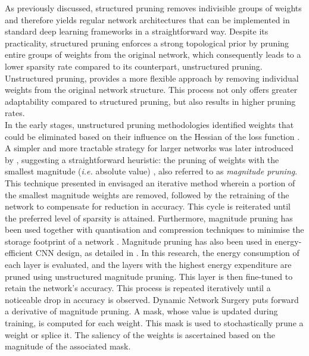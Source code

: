 As previously discussed, structured pruning removes indivisible groups of
weights and therefore yields regular network architectures that can be
implemented in standard deep learning frameworks in a straightforward way.
Despite its practicality, structured pruning enforces a strong topological prior
by pruning entire groups of weights from the original network, which consequently
leads to a lower sparsity rate compared to its counterpart, unstructured
pruning. Unstructured pruning, provides a more flexible approach by removing
individual weights from the original network structure. This process not only
offers greater adaptability compared to structured pruning, but also results in
higher pruning rates.\\

In the early stages, unstructured pruning methodologies identified weights that
could be eliminated based on their influence on the Hessian of the loss function
\cite{DBLP:conf/nips/CunDS89,DBLP:conf/icnn/HassibiSW93,DBLP:conf/nips/HassibiSW93}.
A simpler and more tractable strategy for larger networks was later introduced
by \citeauthor{DBLP:conf/nips/HanPTD15}, suggesting a straightforward heuristic:
the pruning of weights with the smallest magnitude (\emph{i.e.} absolute value)
\cite{DBLP:conf/nips/HanPTD15}, also referred to as \emph{magnitude pruning}.
This technique presented in \cite{DBLP:conf/nips/HanPTD15} envisaged an
iterative method wherein a portion of the smallest magnitude weights are
removed, followed by the retraining of the network to compensate for reduction
in accuracy. This cycle is reiterated until the preferred level of sparsity is
attained. Furthermore, magnitude pruning has been used together with
quantisation and compression techniques to minimise the storage footprint of a
network \cite{DBLP:journals/corr/HanMD15}. Magnitude pruning has also been used
in energy-efficient \ac{CNN} design, as detailed in
\cite{DBLP:conf/cvpr/YangCS17}. In this research, the energy consumption of each
layer is evaluated, and the layers with the highest energy expenditure are
pruned using unstructured magnitude pruning. This layer is then fine-tuned to
retain the network's accuracy. This process is repeated iteratively until a
noticeable drop in accuracy is observed. Dynamic Network Surgery
\cite{DBLP:conf/nips/GuoYC16} puts forward a derivative of magnitude pruning. A
mask, whose value is updated during training, is computed for each weight. This
mask is used to stochastically prune a weight or splice it. The saliency of the
weights is ascertained based on the magnitude of the associated mask.\\

